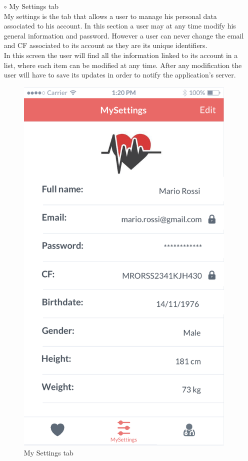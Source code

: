 \documentclass[titlepage]{article}
\begin{document}
\begin{itemize}
\begin{itemize}
\begin{itemize}
					\item[$\circ$] My Settings tab \\
				My settings is the tab that allows a user to manage his personal data associated to his account. In this section a user may at any time modify his general information and password. However a user can never change the email and CF associated to its account as they are its unique identifiers.\\
In this screen the user will find all the information linked to its account in a list, where each item can be modified at any time. After any modification the user will have to save its updates in order to notify the application’s server.\\
					\begin{figure}[H]
						\center
  						\includegraphics[width=0.5\columnwidth]{Mockup/mockupSettingsSU.png}
  						\caption{My Settings tab}
 					 	\label{fig:MyS}
					\end{figure}


\end{itemize}
\end{itemize}
\end{itemize}
\end{document}
